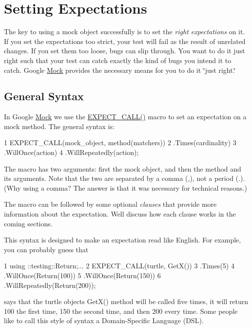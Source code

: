 \section*{Setting Expectations}

The key to using a mock object successfully is to set the {\itshape right expectations} on it. If you set the expectations too strict, your test will fail as the result of unrelated changes. If you set them too loose, bugs can slip through. You want to do it just right such that your test can catch exactly the kind of bugs you intend it to catch. Google \hyperlink{classMock}{Mock} provides the necessary means for you to do it \char`\"{}just right.\char`\"{}

\subsection*{General Syntax}

In Google \hyperlink{classMock}{Mock} we use the {\ttfamily \hyperlink{gmock-spec-builders_8h_a535a6156de72c1a2e25a127e38ee5232}{E\+X\+P\+E\+C\+T\+\_\+\+C\+A\+L\+L()}} macro to set an expectation on a mock method. The general syntax is\+:


\begin{DoxyCode}
1 EXPECT\_CALL(mock\_object, method(matchers))
2     .Times(cardinality)
3     .WillOnce(action)
4     .WillRepeatedly(action);
\end{DoxyCode}


The macro has two arguments\+: first the mock object, and then the method and its arguments. Note that the two are separated by a comma ({\ttfamily ,}), not a period ({\ttfamily .}). (Why using a comma? The answer is that it was necessary for technical reasons.)

The macro can be followed by some optional {\itshape clauses} that provide more information about the expectation. We\textquotesingle{}ll discuss how each clause works in the coming sections.

This syntax is designed to make an expectation read like English. For example, you can probably guess that


\begin{DoxyCode}
1 using ::testing::Return;...
2 EXPECT\_CALL(turtle, GetX())
3     .Times(5)
4     .WillOnce(Return(100))
5     .WillOnce(Return(150))
6     .WillRepeatedly(Return(200));
\end{DoxyCode}


says that the {\ttfamily turtle} object\textquotesingle{}s {\ttfamily Get\+X()} method will be called five times, it will return 100 the first time, 150 the second time, and then 200 every time. Some people like to call this style of syntax a Domain-\/\+Specific Language (D\+SL).

